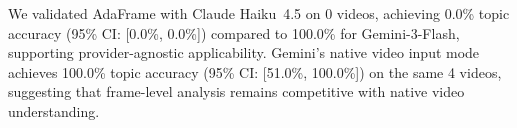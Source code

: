 We validated AdaFrame with Claude Haiku~4.5 on 0 videos, achieving 0.0\%
topic accuracy (95\% CI: [0.0\%, 0.0\%]) compared to 100.0\% for Gemini-3-Flash,
supporting provider-agnostic applicability. Gemini's native video input mode
achieves 100.0\% topic accuracy (95\% CI: [51.0\%, 100.0\%])
on the same 4 videos, suggesting that frame-level analysis remains competitive
with native video understanding.
